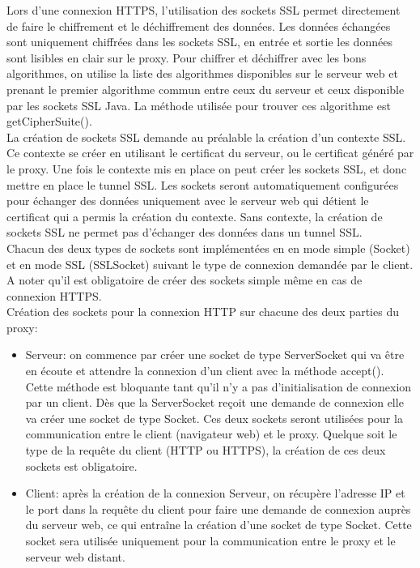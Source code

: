 \documentclass[a4paper,11pt,french]{report}
\begin{document}
Lors d'une connexion HTTPS, l'utilisation des sockets SSL permet directement de 
faire le chiffrement et le déchiffrement des données. Les données échangées sont 
uniquement chiffrées dans les sockets SSL, en entrée et sortie les données sont 
lisibles en clair sur le proxy.
Pour chiffrer et déchiffrer avec les bons algorithmes, on utilise la liste des 
algorithmes disponibles sur le serveur web et prenant le premier algorithme 
commun entre ceux du serveur et ceux disponible par les sockets SSL Java.
La méthode utilisée pour trouver ces algorithme est getCipherSuite().
~~\\

La création de sockets SSL demande au préalable la création d'un contexte SSL. 
Ce contexte se créer en utilisant le certificat du serveur, ou le certificat 
généré par le proxy. Une fois le contexte mis en place on peut créer les sockets 
SSL, et donc mettre en place le tunnel SSL. Les sockets seront automatiquement configurées pour échanger des données 
uniquement avec le serveur web qui détient le certificat qui a permis la 
création du contexte.
Sans contexte, la création de sockets SSL ne permet pas d'échanger des données 
dans un tunnel SSL.
~~\\

Chacun des deux types de sockets sont implémentées en en mode simple (Socket) et 
en mode SSL (SSLSocket) suivant le type de connexion demandée par le client. A 
noter qu'il est obligatoire de créer des sockets simple même en cas de connexion 
HTTPS.
~~\\

Création des sockets pour la connexion HTTP sur chacune des deux parties du proxy:
\begin{itemize}
  \item Serveur: on commence par créer une socket de type ServerSocket qui va 
  être en écoute et attendre la connexion d'un client avec la méthode accept(). 
  Cette méthode est bloquante tant qu'il n'y a pas d'initialisation de connexion 
  par un client. Dès que la ServerSocket reçoit une demande de connexion
  elle va créer une socket de type Socket. Ces deux sockets seront utilisées pour la communication entre le client (navigateur web) et le proxy.
  Quelque soit le type de la requête du client (HTTP ou HTTPS), la 
  création de ces deux sockets est obligatoire.~~\\
  
  \item Client: après la création de la connexion Serveur, on récupère 
  l'adresse IP et le port dans la requête du client pour faire une demande de 
  connexion auprès du serveur web, ce qui entraîne la création d'une socket de 
  type Socket. Cette socket sera utilisée uniquement pour la communication entre 
  le proxy et le serveur web distant. 
\end{itemize}
~~\\
\end{document}
